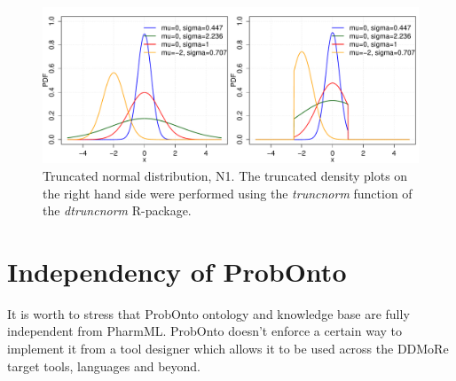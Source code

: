 \begin{figure}[htb!]
\centering
 \includegraphics[width=140mm]{pics/TruncatedNormal1_pdf.pdf}
\caption{Truncated normal distribution, N1. The truncated density plots on the right hand side
were performed using the \emph{truncnorm} function of the \emph{dtruncnorm} R-package.}
\vspace{-1em}
\label{fig:truncatedNormal1}
\end{figure}


\section{Independency of ProbOnto}
\label{sec:ProbOntoIndependent}
It is worth to stress that ProbOnto ontology and knowledge base are fully 
independent from PharmML. ProbOnto doesn't enforce a certain way to implement it from
a tool designer which allows it to be used across the DDMoRe target tools, languages
and beyond. 


